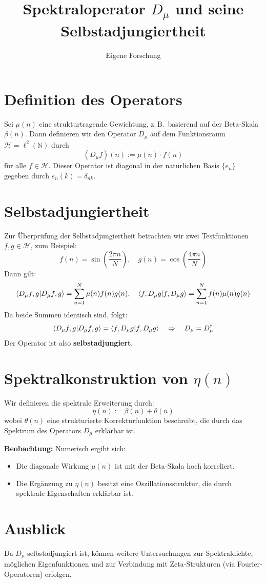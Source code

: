 \documentclass[a4paper,12pt]{article}
\title{Spektraloperator \( D_\mu \) und seine Selbstadjungiertheit}
\author{Eigene Forschung}
\date{}
\begin{document}
\maketitle

\section*{Definition des Operators}

Sei \( \mu(n) \) eine strukturtragende Gewichtung, z.\,B.\ basierend auf der Beta-Skala \( \beta(n) \). Dann definieren wir den Operator \( D_\mu \) auf dem Funktionsraum \( \mathcal{H} = \ell^2(\mathbb{N}) \) durch
\[
(D_\mu f)(n) := \mu(n) \cdot f(n)
\]
für alle \( f \in \mathcal{H} \). Dieser Operator ist diagonal in der natürlichen Basis \( \{e_n\} \) gegeben durch \( e_n(k) = \delta_{nk} \).

\section*{Selbstadjungiertheit}

Zur Überprüfung der Selbstadjungiertheit betrachten wir zwei Testfunktionen \( f, g \in \mathcal{H} \), zum Beispiel:
\[
f(n) = \sin\left(\frac{2\pi n}{N}\right), \quad g(n) = \cos\left(\frac{4\pi n}{N}\right)
\]
Dann gilt:
\[
\braket{D_\mu f, g} = \sum_{n=1}^{N} \mu(n) f(n) g(n), \quad
\braket{f, D_\mu g} = \sum_{n=1}^{N} f(n) \mu(n) g(n)
\]
Da beide Summen identisch sind, folgt:
\[
\braket{D_\mu f, g} = \braket{f, D_\mu g} \quad \Rightarrow \quad D_\mu = D_\mu^\dagger
\]
Der Operator ist also \textbf{selbstadjungiert}.

\section*{Spektralkonstruktion von \( \eta(n) \)}

Wir definieren die spektrale Erweiterung durch:
\[
\eta(n) := \beta(n) + \theta(n)
\]
wobei \( \theta(n) \) eine strukturierte Korrekturfunktion beschreibt, die durch das Spektrum des Operators \( D_\mu \) erklärbar ist.

\textbf{Beobachtung:} Numerisch ergibt sich:
\begin{itemize}
    \item Die diagonale Wirkung \( \mu(n) \) ist mit der Beta-Skala hoch korreliert.
    \item Die Ergänzung zu \( \eta(n) \) besitzt eine Oszillationsstruktur, die durch spektrale Eigenschaften erklärbar ist.
\end{itemize}

\section*{Ausblick}

Da \( D_\mu \) selbstadjungiert ist, können weitere Untersuchungen zur Spektraldichte, möglichen Eigenfunktionen und zur Verbindung mit Zeta-Strukturen (via Fourier-Operatoren) erfolgen.
\end{document}
